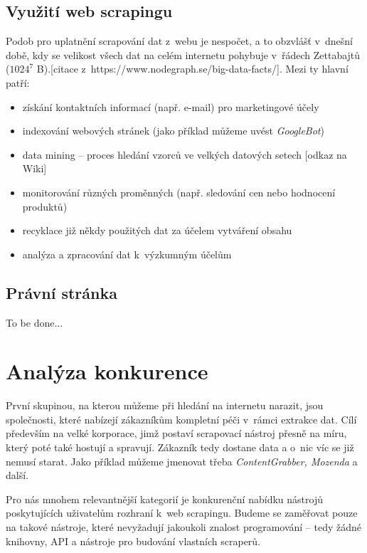 \documentclass[thesis=B,czech]{FITthesis}[2012/06/26]
\begin{document}
\subsection{Využití web scrapingu}
Podob pro uplatnění scrapování dat z~webu je nespočet, a to obzvlášť v~dnešní době, kdy se velikost všech dat na celém internetu pohybuje v~řádech Zettabajtů ($1024^{7}$ B).[citace z~https://www.nodegraph.se/big-data-facts/]. Mezi ty hlavní patří:
\begin{itemize}
	\item získání kontaktních informací (např. e-mail) pro marketingové účely
	\item indexování webových stránek (jako příklad můžeme uvést \emph{GoogleBot})
	\item data mining -- proces hledání vzorců ve velkých datových setech [odkaz na Wiki]
	\item monitorování různých proměnných (např. sledování cen nebo hodnocení produktů)
	\item recyklace již někdy použitých dat za účelem vytváření  obsahu
	\item analýza a zpracování dat k~výzkumným účelům
\end{itemize}

\subsection{Právní stránka}
To be done...


\newpage
\section{Analýza konkurence}
První skupinou, na kterou můžeme při hledání na internetu narazit, jsou společnosti, které nabízejí zákazníkům kompletní péči v~rámci extrakce dat. Cílí především na velké korporace, jimž postaví scrapovací nástroj přesně na míru, který poté také hostují a spravují. Zákazník tedy dostane data a o~nic víc se již nemusí starat. Jako příklad můžeme jmenovat třeba \emph{ContentGrabber, Mozenda} a další.

Pro nás mnohem relevantnější kategorií je konkurenční nabídku nástrojů poskytujících uživatelům rozhraní k~web scrapingu. Budeme se zaměřovat pouze na takové nástroje, které nevyžadují jakoukoli znalost programování -- tedy žádné knihovny, API a nástroje pro budování vlastních scraperů.
\end{document}
